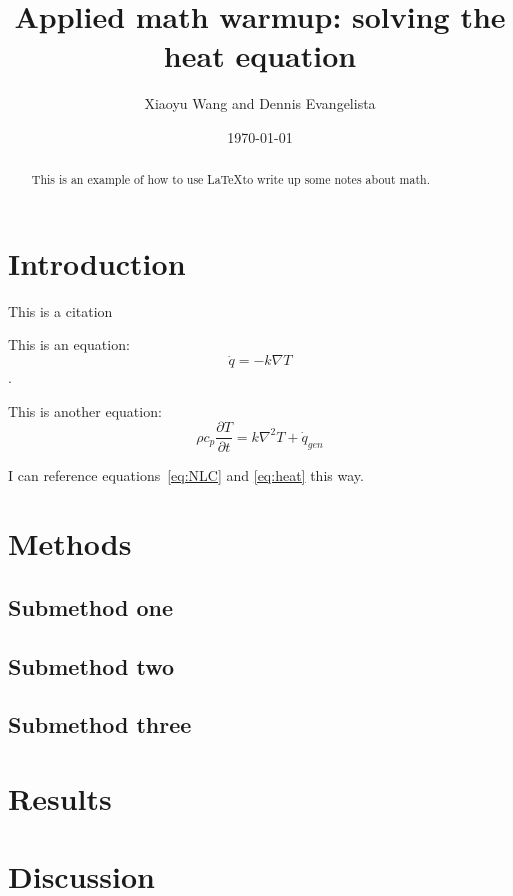 \documentclass{amsart}
\title{Applied math warmup: solving the heat equation}
\author{Xiaoyu Wang and Dennis Evangelista}
\date{\today}
\begin{document}
\begin{abstract}
This is an example of how to use \LaTeX to write up some notes about math. 
\end{abstract}
\maketitle
\tableofcontents

\section{Introduction}
This is a citation \cite{Baker:2012}

This is an equation:
\begin{equation}
\dot{q} = - k \nabla T
\label{eq:NLC}
\end{equation}.

This is another equation:
\begin{equation}
\rho c_p \frac{\partial T}{\partial t} = 
k \nabla^2 T + \dot{q}_{gen}
\label{eq:heat}
\end{equation}

I can reference equations~\ref{eq:NLC} and \ref{eq:heat} this way. 

\section{Methods}
\subsection{Submethod one}
\subsection{Submethod two}
\subsection{Submethod three}

\section{Results}
\section{Discussion}



\end{document}
